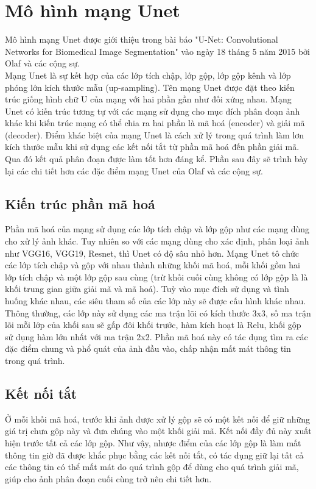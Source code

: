 \section{Mô hình mạng Unet}
Mô hình mạng Unet được giới thiệu trong bài báo "U-Net: Convolutional Networks for Biomedical Image Segmentation" vào ngày 18 tháng 5 năm 2015 bởi Olaf và các cộng sự.\cite{unet_paper}\\
Mạng Unet là sự kết hợp của các lớp tích chập, lớp gộp, lớp gộp kênh và lớp phóng lớn kích thước mẫu (up-sampling). Tên mạng Unet được đặt theo kiến trúc giống hình chữ U của mạng với hai phần gần như đối xứng nhau. Mạng Unet có kiến trúc tương tự với các mạng sử dụng cho mục đích phân đoạn ảnh khác khi kiến trúc mạng có thể chia ra hai phần là mã hoá (encoder) và giải mã (decoder). Điểm khác biệt của mạng Unet là cách xử lý trong quá trình làm lơn kích thước mẫu khi sử dụng các kết nối tắt từ phần mã hoá đến phần giải mã. Qua đó kết quả phân đoạn được làm tốt hơn đáng kể. Phần sau đây sẽ trình bày lại các chi tiết hơn các đặc điểm mạng Unet của Olaf và các cộng sự. 
\subsection{Kiến trúc phần mã hoá}
Phần mã hoá của mạng sử dụng các lớp tích chập và lớp gộp như các mạng dùng cho xử lý ảnh khác. Tuy nhiên so với các mạng dùng cho xác định, phân loại ảnh như VGG16, VGG19, Resnet, thì Unet có độ sâu nhỏ hơn. Mạng Unet tô chức các lớp tích chập và gộp với nhau thành những khối mã hoá, mỗi khối gồm hai lớp tích chập và một lớp gộp sau cùng (trừ khối cuối cùng không có lớp gộp là là khối trung gian giữa giải mã và mã hoá). Tuỳ vào mục đích sử dụng và tình huống khác nhau, các siêu tham số của các lớp này sẽ được cấu hình khác nhau. Thông thường, các lớp này sử dụng các ma trận lõi có kích thước 3x3, số ma trận lõi mỗi lớp của khối sau sẽ gấp đôi khối trước, hàm kích hoạt là Relu, khối gộp sử dụng hàm lớn nhất với ma trận 2x2. Phần mã hoá này có tác dụng tìm ra các đặc điểm chung và phổ quát của ảnh đầu vào, chấp nhận mất mát thông tin trong quá trình.

\subsection{Kết nối tắt}
Ở mỗi khối mã hoá, trước khi ảnh được xử lý gộp sẽ có một kết nối để giữ những giá trị chưa gộp này và đưa chúng vào một khối giải mã. Kết nối đầy đủ này xuất hiện trước tất cả các lớp gộp. Như vậy, nhược điểm của các lớp gộp là làm mất thông tin giờ đã được khắc phục bằng các kết nối tắt, có tác dụng giữ lại tất cả các thông tin có thể mất mát do quá trình gộp để dùng cho quá trình giải mã, giúp cho ảnh phân đoạn cuối cùng trở nên chi tiết hơn.

